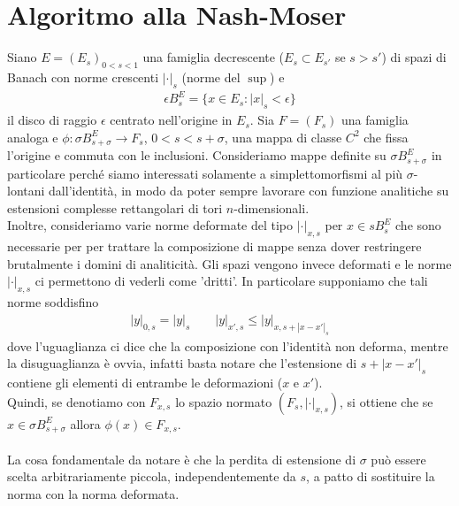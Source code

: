 \documentclass[twoside, 11pt]{amsbook}
\newcommand{\0}{{(0)}}
\newcommand{\3}{{(3)}}
\theoremstyle{colonplain}
\theoremstyle{colondefinition}
\theoremstyle{colonremark}
\numberwithin{equation}{chapter}
\begin{document}
\section{Algoritmo alla Nash-Moser}
Siano $E = (E_s)_{0 < s < 1}$ una famiglia decrescente ($E_s \subset E_{s'}$ se $s > s'$) di spazi di Banach con norme crescenti $|\cdot|_s$ (norme del $\sup$) e
\begin{align}
    \epsilon B^E_s = \{x \in E_s : |x|_s < \epsilon\} 
\end{align}
il disco di raggio $\epsilon$ centrato nell'origine in $E_s$. Sia $F = (F_s)$ una famiglia analoga e $\phi : \sigma B^E_{s + \sigma} \longrightarrow F_s$, $0 < s < s + \sigma$, una mappa di classe $C^2$ che fissa l'origine e commuta con le inclusioni. Consideriamo mappe definite su $\sigma B^E_{s + \sigma}$ in particolare perché siamo interessati solamente a simplettomorfismi al più $\sigma$-lontani dall'identità, in modo da poter sempre lavorare con funzione analitiche su estensioni complesse rettangolari di tori $n$-dimensionali. \\
Inoltre, consideriamo varie norme deformate del tipo $|\cdot|_{x, s}$ per $x \in sB^E_{s}$ che sono necessarie per per trattare la composizione di mappe senza dover restringere brutalmente i domini di analiticità. Gli spazi vengono invece deformati e le norme $|\cdot|_{x, s}$ ci permettono di vederli come 'dritti'. In particolare supponiamo che tali norme soddisfino
\begin{align}\label{DefrmNormEst}
    |y|_{0, s} = |y|_s \qquad |y|_{x', s} \leq |y|_{x, s + |x - x'|_s} 
\end{align}
dove l'uguaglianza ci dice che la composizione con l'identità non deforma, mentre la disuguaglianza è ovvia, infatti basta notare che l'estensione di $s + |x - x'|_s$ contiene gli elementi di entrambe le deformazioni ($x$ e $x'$). \\
Quindi, se denotiamo con $F_{x, s}$ lo spazio normato $(F_s, |\cdot|_{x, s})$, si ottiene che se $x \in \sigma B^E_{s + \sigma}$ allora $\phi(x) \in F_{x, s}$. \\ \\
La cosa fondamentale da notare è che la perdita di estensione di $\sigma$ può essere scelta arbitrariamente piccola, independentemente da $s$, a patto di sostituire la norma con la norma deformata.
\end{document}
